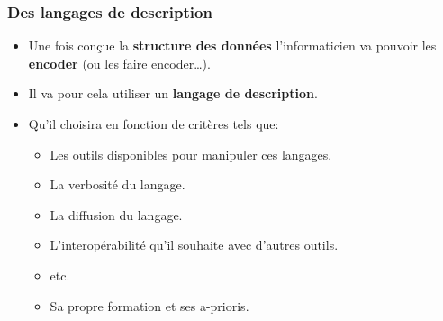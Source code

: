 \subsubsection{Des langages de description}

\begin{slide}
  \begin{itemize}
    \item Une fois conçue la \textbf{structure des données} l'informaticien va pouvoir les \textbf{encoder} (ou les faire encoder…).
    \item Il va pour cela utiliser un \textbf{langage de description}.
    \item Qu'il choisira en fonction de critères tels que:
      \begin{itemize}
	\item Les outils disponibles pour manipuler ces langages.
	\item La verbosité du langage.
	\item La diffusion du langage.
	\item L'interopérabilité qu'il souhaite avec d'autres outils.
	\item etc.
	\item Sa propre formation et ses a-prioris.
      \end{itemize}
  \end{itemize}
\end{slide}

\begin{slide}

		\beamerdefaultoverlayspecification{}

		
	
		
\end{slide}

